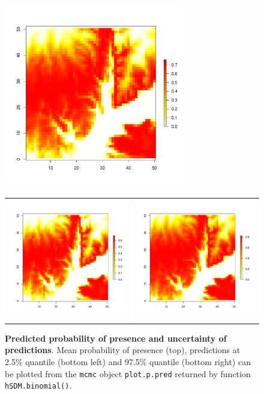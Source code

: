 \documentclass[a4paper, 12pt, leqno]{article}\usepackage[]{graphicx}\usepackage[]{color}
\begin{document}
\begin{figure}[!h] 
  \centering \includegraphics[width=8cm]{figures/predictions-binomial1.pdf} \\
  \begin{tabular}{cc}
    \includegraphics[width=8cm]{figures/predictions-binomial2.pdf} &
    \includegraphics[width=8cm]{figures/predictions-binomial3.pdf} \\
  \end{tabular}
  
  \caption{\textbf{Predicted probability of presence and uncertainty of predictions}. Mean
    probability of presence (top), predictions at 2.5\% quantile (bottom left) and 97.5\%
    quantile (bottom right) can be plotted from the \texttt{mcmc} object
    \texttt{plot.p.pred} returned by function \texttt{hSDM.binomial()}.}
  
  \label{fig:predictions-binomial}
  
\end{figure}
\end{document}
